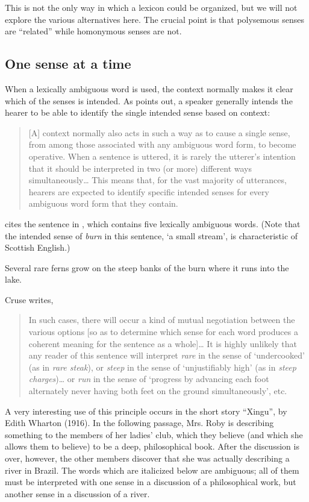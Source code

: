 This is not the only way in which a lexicon could be organized, but we will not explore the various alternatives here. The crucial point is that polysemous senses are “related” while homonymous senses are not.


\subsection{One sense at a time}\label{sec:5.3.4}

When a lexically ambiguous word is used, the context normally makes it clear which of the senses is intended. As \citet[53]{Cruse1986} points out, a speaker generally intends the hearer to be able to identify the single intended sense based on context:

\begin{quote}
[A] context normally also acts in such a way as to cause a single sense, from among those associated with any ambiguous word form, to become operative. When a sentence is uttered, it is rarely the utterer’s intention that it should be interpreted in two (or more) different ways simultaneously… This means that, for the vast majority of utterances, hearers are expected to identify specific intended senses for every ambiguous word form that they contain.
\end{quote}


\citet[54]{Cruse1986} cites the sentence in , which contains five lexically ambiguous words. (Note that the intended sense of \textit{burn} in this sentence, ‘a small stream’, is characteristic of Scottish English.)


\ea \label{ex:5.16}
Several rare ferns grow on the steep banks of the burn where it runs into the lake.
\z

Cruse writes,

\begin{quote}
In such cases, there will occur a kind of mutual negotiation between the various options [so as to determine which sense for each word produces a coherent meaning for the sentence as a whole]… It is highly unlikely that any reader of this sentence will interpret \textit{rare} in the sense of ‘undercooked’ (as in \textit{rare steak}), or \textit{steep} in the sense of ‘unjustifiably high’ (as in \textit{steep charges})… or \textit{run} in the sense of ‘progress by advancing each foot alternately never having both feet on the ground simultaneously’, etc.
\end{quote}


A very interesting use of this principle occurs in the short story “Xingu”, by Edith Wharton (1916). In the following passage, Mrs. Roby is describing something to the members of her ladies’ club, which they believe (and which she allows them to believe) to be a deep, philosophical book. After the discussion is over, however, the other members discover that she was actually describing a river in Brazil. The words which are italicized below are ambiguous; all of them must be interpreted with one sense in a discussion of a philosophical work, but another sense in a discussion of a river.

